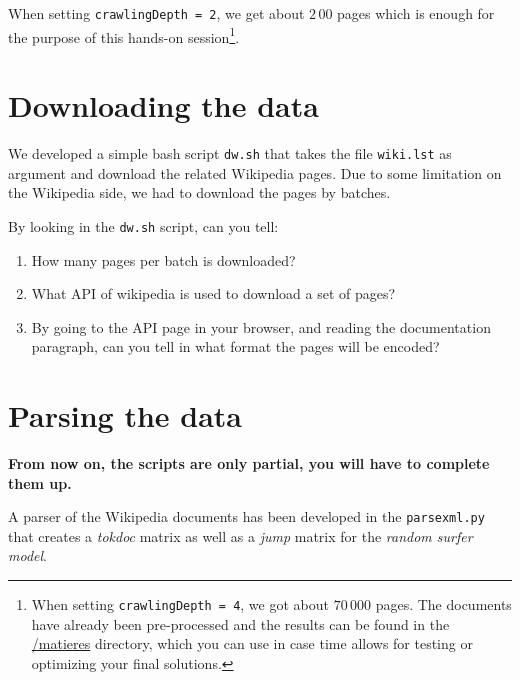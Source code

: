 \documentclass[mathserif, 11pt,c]{article}
\begin{document}
When setting \texttt{crawlingDepth = 2}, we get about $2\,00$ pages which is enough for the purpose of this hands-on session\footnote{When setting \texttt{crawlingDepth = 4}, we got about $70\,000$ pages. The documents have already been pre-processed and the results can be found in the \url{/matieres} directory, which you can use in case time allows for testing or optimizing your final solutions.}.

\section{Downloading the data}

We developed a simple bash script \texttt{dw.sh} that takes the file \texttt{wiki.lst} as argument and download the related Wikipedia pages. Due to some limitation on the Wikipedia side, we had to download the pages by batches.

By looking in the \texttt{dw.sh} script, can you tell:
\begin{enumerate}[label=\textbf{Q\thesection.\arabic*}]
	\item How many pages per batch is downloaded?
	\item What API of wikipedia is used to download a set of pages?
	\item By going to the API page in your browser, and reading the documentation paragraph, can you tell in what format the pages will be encoded?
\end{enumerate}


\section{Parsing the data}

\textbf{From now on, the scripts are only partial, you will have to complete them up.}


A parser of the Wikipedia documents has been developed in the \texttt{parsexml.py} that creates a \textit{tokdoc} matrix as well as a \textit{jump} matrix for the \textit{random surfer model}.
\end{document}
